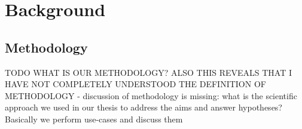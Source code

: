 \chapter{Background}
\label{ch:methodology}





\section{Methodology}
TODO WHAT IS OUR METHODOLOGY? ALSO THIS REVEALS THAT I HAVE NOT COMPLETELY UNDERSTOOD THE DEFINITION OF METHODOLOGY
- discussion of methodology is missing: what is the scientific approach we used in our thesis to address the aims and answer hypotheses? Basically we perform use-cases and discuss them
